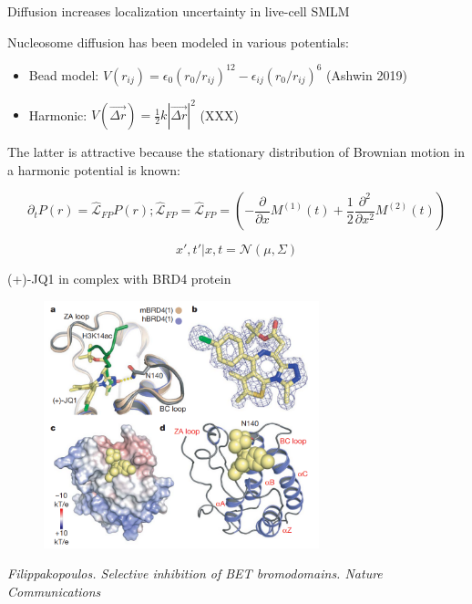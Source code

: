 \documentclass{beamer}					%
\begin{document}
\begin{frame}{Diffusion increases localization uncertainty in live-cell SMLM}

Nucleosome diffusion has been modeled in various potentials:
\vspace{0.1in}
\begin{itemize}
\item Bead model: $V(r_{ij}) = \epsilon_{0}(r_{0}/r_{ij})^{12}-\epsilon_{ij}(r_{0}/r_{ij})^{6}$ (Ashwin 2019)
\item Harmonic: $V(\vec{\Delta r}) = \frac{1}{2}k|\vec{\Delta r}|^{2}$ (XXX)
\end{itemize}
\vspace{0.1in}
The latter is attractive because the stationary distribution of Brownian motion in a harmonic potential is known:


\begin{equation*}
\partial_{t}P(r) = \hat{\mathcal{L}}_{FP}P(r); \hat{\mathcal{L}}_{FP} = \hat{\mathcal{L}}_{FP} = \left(-\frac{\partial}{\partial x}M^{(1)}(t) + \frac{1}{2}\frac{\partial^{2}}{\partial x^{2}}M^{(2)}(t)\right)
\end{equation*}


\begin{equation*}
x',t'|x,t = \mathcal{N}(\mu,\Sigma)
\end{equation*}

\end{frame}

\begin{frame}{(+)-JQ1 in complex with BRD4 protein}
\begin{figure}
\includegraphics[width=8cm]{JQ1.png}
\end{figure}
\textit{Filippakopoulos. Selective inhibition of BET bromodomains. Nature Communications}
\end{frame}
\end{document}
